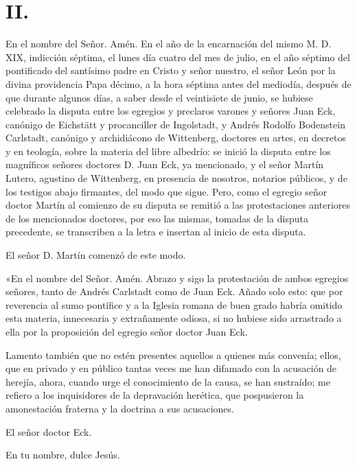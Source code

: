 \section*{II.}

En el nombre del Señor. Amén. En el año de la encarnación del mismo M. D. XIX, indicción séptima, el lunes día cuatro del mes de julio, en el año séptimo del pontificado del santísimo padre en Cristo y señor nuestro, el señor León por la divina providencia Papa décimo, a la hora séptima antes del mediodía, después de que durante algunos días, a saber desde el veintisiete de junio, se hubiese celebrado la disputa entre los egregios y preclaros varones y señores Juan Eck, canónigo de Eichstätt y procanciller de Ingolstadt, y Andrés Rodolfo Bodenstein Carlstadt, canónigo y archidiácono de Wittenberg, doctores en artes, en decretos y en teología, sobre la materia del libre albedrío: se inició la disputa entre los magníficos señores doctores D. Juan Eck, ya mencionado, y el señor Martín Lutero, agustino de Wittenberg, en presencia de nosotros, notarios públicos, y de los testigos abajo firmantes, del modo que sigue. Pero, como el egregio señor doctor Martín al comienzo de su disputa se remitió a las protestaciones anteriores de los mencionados doctores, por eso las mismas, tomadas de la disputa precedente, se transcriben a la letra e insertan al inicio de esta disputa.

El señor D. Martín comenzó de este modo.

«En el nombre del Señor. Amén. Abrazo y sigo la protestación de ambos egregios señores, tanto de Andrés Carlstadt como de Juan Eck. Añado solo esto: que por reverencia al sumo pontífice y a la Iglesia romana de buen grado habría omitido esta materia, innecesaria y extrañamente odiosa, si no hubiese sido arrastrado a ella por la proposición del egregio señor doctor Juan Eck.

Lamento también que no estén presentes aquellos a quienes más convenía; ellos, que en privado y en público tantas veces me han difamado con la acusación de herejía, ahora, cuando urge el conocimiento de la causa, se han sustraído; me refiero a los inquisidores de la depravación herética, que pospusieron la amonestación fraterna y la doctrina a sus acusaciones.

\marginpar{\small[255]} El señor doctor Eck.

En tu nombre, dulce Jesús.

